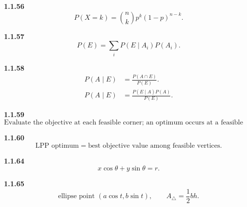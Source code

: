 \noindent\textbf{1.1.56}\quad
\begin{equation}
P(X=k)=\binom nkp^k(1-p)^{n-k}.
\tag{1.1.56.1}\label{eq:binomial-56}
\end{equation}

\noindent\textbf{1.1.57}\quad
\begin{equation}
P(E)=\sum_iP(E\mid A_i)P(A_i).
\tag{1.1.57.1}\label{eq:total-probability-57}
\end{equation}

\noindent\textbf{1.1.58}\quad
\begin{align}
P(A\mid E)&=\frac{P(A\cap E)}{P(E)}.
\tag{1.1.58.1}\label{eq:conditional-probability-58}\\
P(A\mid E)&=\frac{P(E\mid A)P(A)}{P(E)}.
\tag{1.1.58.2}\label{eq:bayes-58-2}
\end{align}

\noindent\textbf{1.1.59}\quad
\begin{equation}
\text{Evaluate the objective at each feasible corner; an optimum occurs at a feasible vertex.}
\tag{1.1.59.1}\label{eq:lpp-59}
\end{equation}

\noindent\textbf{1.1.60}\quad
\begin{equation}
\text{LPP optimum}=\text{best objective value among feasible vertices}.
\tag{1.1.60.1}\label{eq:lpp-60}
\end{equation}

\noindent\textbf{1.1.64}\quad
\begin{equation}
x\cos\theta+y\sin\theta=r.
\tag{1.1.64.1}\label{eq:circle-tangent-64}
\end{equation}

\noindent\textbf{1.1.65}\quad
\begin{equation}
\text{ellipse point }(a\cos t,b\sin t),\qquad
A_{\triangle}=\frac12 bh.
\tag{1.1.65.1}\label{eq:ellipse-area-65}
\end{equation}
